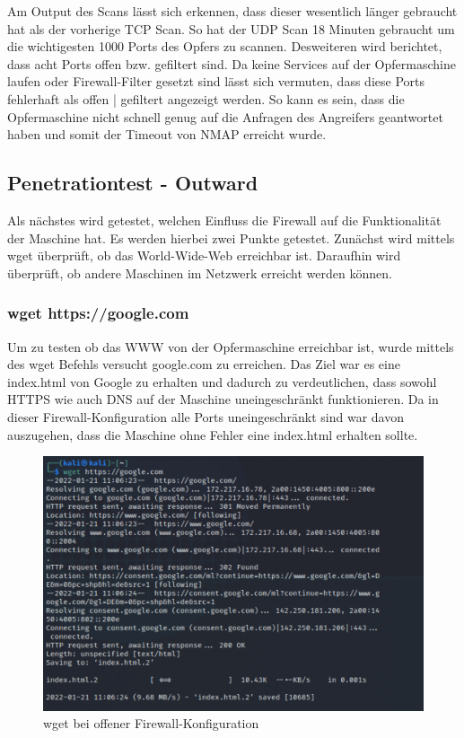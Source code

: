 

Am Output des Scans lässt sich erkennen, dass dieser wesentlich länger gebraucht hat als der vorherige TCP Scan. So hat der UDP Scan 18 Minuten gebraucht um die wichtigesten 1000 Ports des Opfers zu scannen. Desweiteren wird berichtet, dass acht Ports offen bzw. gefiltert sind. Da keine Services auf der Opfermaschine laufen oder Firewall-Filter gesetzt sind lässt sich vermuten, dass diese Ports fehlerhaft als offen | gefiltert angezeigt werden. So kann es sein, dass die Opfermaschine nicht schnell genug auf die Anfragen des Angreifers geantwortet haben und somit der Timeout von NMAP erreicht wurde. 

\subsection{Penetrationtest - Outward}
Als nächstes wird getestet, welchen Einfluss die Firewall auf die Funktionalität der Maschine hat. Es werden hierbei zwei Punkte getestet. Zunächst wird mittels wget überprüft, ob das World-Wide-Web erreichbar ist. Daraufhin wird überprüft, ob andere Maschinen im Netzwerk erreicht werden können. 

\subsubsection*{wget https://google.com}

Um zu testen ob das WWW von der Opfermaschine erreichbar ist, wurde mittels des wget Befehls versucht google.com zu erreichen. Das Ziel war es eine index.html von Google zu erhalten und dadurch zu verdeutlichen, dass sowohl HTTPS wie auch DNS auf der Maschine uneingeschränkt funktionieren. Da in dieser Firewall-Konfiguration alle Ports uneingeschränkt sind war davon auszugehen, dass die Maschine ohne Fehler eine index.html erhalten sollte. \\
\begin{figure}
	\includegraphics[width=\linewidth]{img/open-in-out-output.png}
	\caption{wget bei offener Firewall-Konfiguration}
	\label{fig:wget_open}
\end{figure}

